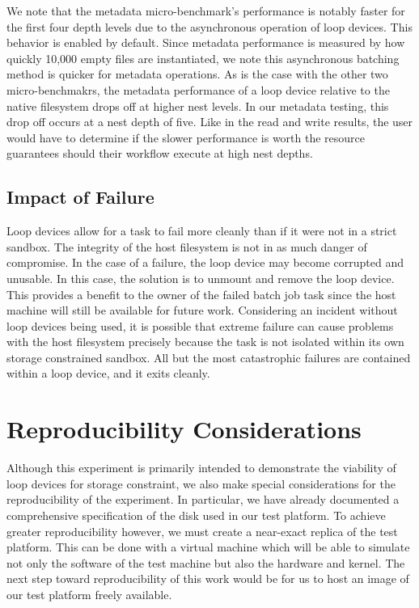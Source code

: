 \documentclass[conference]{IEEEtran}
\begin{document}
We note that the metadata micro-benchmark's performance is notably faster for the first four depth levels due to the asynchronous operation of loop devices. This behavior is enabled by default. Since metadata performance is measured by how quickly 10,000 empty files are instantiated, we note this asynchronous batching method is quicker for metadata operations. As is the case with the other two micro-benchmakrs, the metadata performance of a loop device relative to the native filesystem drops off at higher nest levels. In our metadata testing, this drop off occurs at a nest depth of five. Like in the read and write results, the user would have to determine if the slower performance is worth the resource guarantees should their workflow execute at high nest depths.

\subsection{Impact of Failure}
Loop devices allow for a task to fail more cleanly than if it were not in a strict sandbox. The integrity of the host filesystem is not in as much danger of compromise. In the case of a failure, the loop device may become corrupted and unusable. In this case, the solution is to unmount and remove the loop device. This provides a benefit to the owner of the failed batch job task since the host machine will still be available for future work. Considering an incident without loop devices being used, it is possible that extreme failure can cause problems with the host filesystem precisely because the task is not isolated within its own storage constrained sandbox. All but the most catastrophic failures are contained within a loop device, and it exits cleanly.

\section{Reproducibility Considerations}
Although this experiment is primarily intended to demonstrate the viability of loop devices for storage constraint, we also make special considerations for the reproducibility of the experiment. In particular, we have already documented a comprehensive specification of the disk used in our test platform. To achieve greater reproducibility however, we must create a near-exact replica of the test platform. This can be done with a virtual machine which will be able to simulate not only the software of the test machine but also the hardware and kernel. The next step toward reproducibility of this work would be for us to host an image of our test platform freely available.
\end{document}
